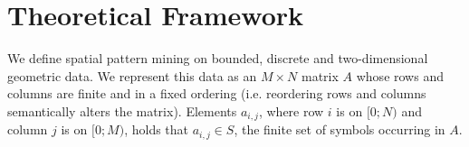 \documentclass{llncs}
\begin{document}
\section{Theoretical Framework}



We define spatial pattern mining on bounded, discrete and two-dimensional geometric data. We represent this data as an $M\times N$ matrix $A$ whose rows and columns are finite and in a fixed ordering (i.e. reordering rows and columns semantically alters the matrix). Elements $a_{i,j}$, where row $i$ is on $[0;N)$ and column $j$ is on $[0;M)$, holds that $a_{i,j} \in S$, the finite set of symbols occurring in $A$. %

\begin{figure}

\label{example1}
\end{figure}
\end{document}
